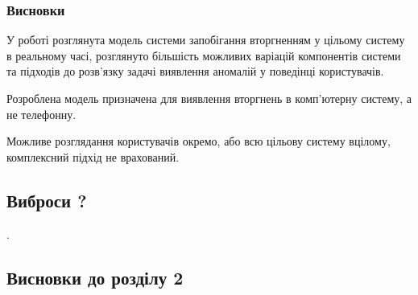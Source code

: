 \subsubsection{Висновки}
    У роботі розглянута модель системи запобігання вторгненням у цільому систему в реальному часі, розглянуто більшість можливих варіацій компонентів системи та підходів до розв'язку задачі виявлення аномалій у поведінці користувачів.

    Розроблена модель призначена для виявлення вторгнень в
    комп'ютерну систему, а не телефонну.

    Можливе розглядання користувачів окремо, або всю цільову
    систему вцілому, комплексний підхід не врахований.

\subsection{Виброси ? \TBD}
    \TBD \cite{ben2005outlier}.


\newpage
\subsection*{Висновки до розділу 2}
    \TBD
